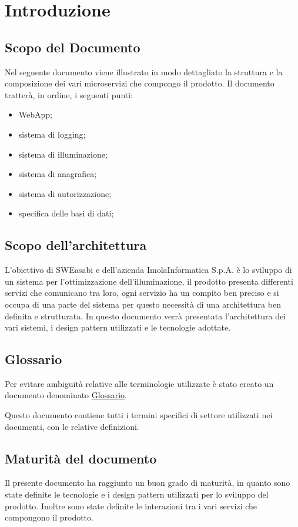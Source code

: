 \chapter{Introduzione}

\section{Scopo del Documento}
Nel seguente documento viene illustrato in modo dettagliato la struttura e la composizione dei vari microservizi che compongo il prodotto. Il documento tratterà, in ordine, i seguenti punti:
\begin{itemize}
    \item WebApp;
    \item sistema di logging;
    \item sistema di illuminazione;
    \item sistema di anagrafica;
    \item sistema di autorizzazione;
    \item specifica delle basi di dati;
\end{itemize}

\section{Scopo dell'architettura}
L'obiettivo di SWEasabi e dell'azienda ImolaInformatica S.p.A. è lo sviluppo di un sistema per l'ottimizzazione dell'illuminazione, il prodotto presenta differenti servizi che comunicano tra loro, ogni servizio ha un compito ben preciso e si occupa di una parte del sistema per questo necessità di una architettura ben definita e strutturata.
In questo documento verrà presentata l'architettura dei vari sistemi, i design pattern utilizzati e le tecnologie adottate.


\section{Glossario}
Per evitare ambiguità relative alle terminologie utilizzate è stato creato un documento denominato \href{https://github.com/SWEasabi/glossario/releases}{Glossario}.

Questo documento contiene tutti i termini specifici di settore utilizzati nei documenti, con le relative definizioni.

\section{Maturità del documento}
Il presente documento ha raggiunto un buon grado di maturità, in quanto sono state definite le tecnologie e i design pattern utilizzati per lo sviluppo del prodotto. Inoltre sono state definite le interazioni tra i vari servizi che compongono il prodotto.

